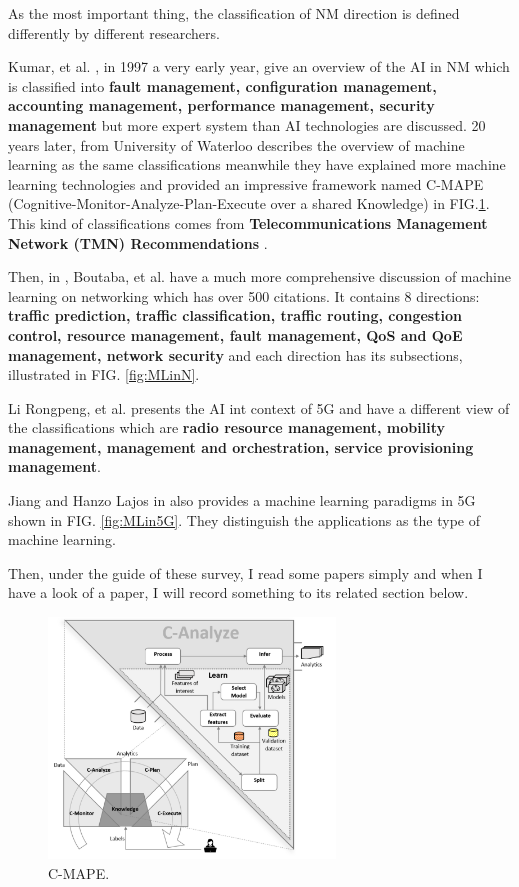 \documentclass[journal,UTF8]{IEEEtran}
\begin{document}
As the most important thing, the classification of NM direction is defined differently by different researchers.

Kumar, et al. \cite{Kumar1997Artificial}, in 1997 a very early year, give an overview of the AI in NM which is classified into \textbf{fault management, configuration management, accounting management, performance management, security management} but more expert system than AI technologies are discussed. 20 years later, \cite{Ayoubi2018Machine} from University of Waterloo describes the overview of machine learning as the same classifications meanwhile they have explained more machine learning technologies and provided an impressive framework named C-MAPE (Cognitive-Monitor-Analyze-Plan-Execute over a shared Knowledge) in FIG.\ref{fig:CMAPE}. This kind of classifications comes from \textbf{Telecommunications Management Network (TMN) Recommendations} \cite{ITU1992TMN}.

Then, in \cite{Boutaba2018A}, Boutaba, et al. have a much more comprehensive discussion of machine learning on networking which has over 500 citations. It contains 8 directions: \textbf{traffic prediction, traffic classification, traffic routing, congestion control, resource management, fault management, QoS and QoE management, network security} and each direction has its subsections, illustrated in FIG. \ref{fig:MLinN}. 



Li Rongpeng, et al. \cite{Li2017Intelligent} presents the AI int context of 5G and have a different view of the classifications which are \textbf{radio resource management, mobility management, management and orchestration, service provisioning management}.

Jiang and Hanzo Lajos in \cite{Jiang2017Machine} also provides a machine learning paradigms in 5G shown in FIG. \ref{fig:MLin5G}. They distinguish the applications as the type of machine learning.

Then, under the guide of these survey, I read some papers simply and when I have a look of a paper, I will record something to its related section below. 

\begin{figure}
	\centering
	\includegraphics[width=3in]{fig/C-MAPE.png}
	\caption{C-MAPE.}
	\label{fig:CMAPE}
\end{figure}
\end{document}
